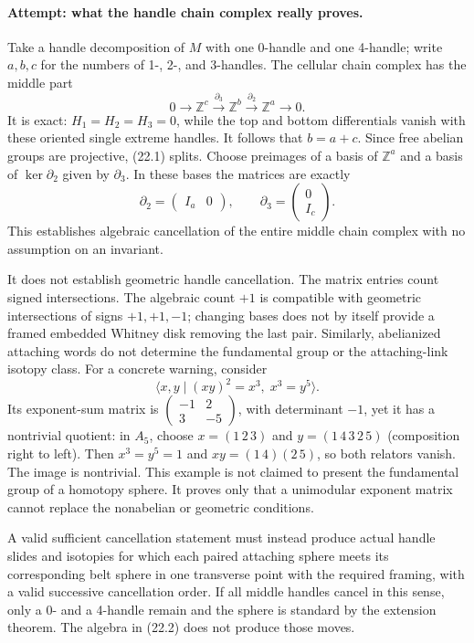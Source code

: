 \documentclass[11pt,a4paper]{article}
\newcommand{\Z}{\mathbb{Z}}
\begin{document}
\paragraph{Attempt: what the handle chain complex really proves.}
Take a handle decomposition of $M$ with one 0-handle and one 4-handle;
write $a,b,c$ for the numbers of 1-, 2-, and 3-handles. The cellular
chain complex has the middle part
\[
 0\longrightarrow\Z^c\xrightarrow{\partial_3}\Z^b
       \xrightarrow{\partial_2}\Z^a\longrightarrow0.
 \tag{22.1}
\]
It is exact: $H_1=H_2=H_3=0$, while the top and bottom differentials
vanish with these oriented single extreme handles. It follows that
$b=a+c$. Since free abelian groups are projective, (22.1) splits. Choose
preimages of a basis of $\Z^a$ and a basis of $\ker\partial_2$ given by
$\partial_3$. In these bases the matrices are exactly
\[
 \partial_2=\begin{pmatrix}I_a&0\end{pmatrix},\qquad
 \partial_3=\begin{pmatrix}0\\I_c\end{pmatrix}.
 \tag{22.2}
\]
This establishes algebraic cancellation of the entire middle chain
complex with no assumption on an invariant.

It does not establish geometric handle cancellation. The matrix entries
count signed intersections. The algebraic count $+1$ is compatible with
geometric intersections of signs $+1,+1,-1$; changing bases does not by
itself provide a framed embedded Whitney disk removing the last pair.
Similarly, abelianized attaching words do not determine the fundamental
group or the attaching-link isotopy class. For a concrete warning, consider
\[
 \langle x,y\mid (xy)^2=x^3,\;x^3=y^5\rangle.
 \tag{22.3}
\]
Its exponent-sum matrix is
$\left(\begin{smallmatrix}-1&2\\3&-5\end{smallmatrix}\right)$,
with determinant $-1$, yet it has a nontrivial quotient: in $A_5$, choose
$x=(1\,2\,3)$ and $y=(1\,4\,3\,2\,5)$ (composition right to left).
Then $x^3=y^5=1$ and $xy=(1\,4)(2\,5)$, so both relators vanish.
The image is nontrivial. This example is not claimed to present the
fundamental group of a homotopy sphere. It proves only that a unimodular
exponent matrix cannot replace the nonabelian or geometric conditions.

A valid sufficient cancellation statement must instead produce actual
handle slides and isotopies for which each paired attaching sphere meets
its corresponding belt sphere in one transverse point with the required
framing, with a valid successive cancellation order. If all middle
handles cancel in this sense, only a 0- and a 4-handle remain and the
sphere is standard by the extension theorem. The algebra in (22.2)
does not produce those moves.
\end{document}

